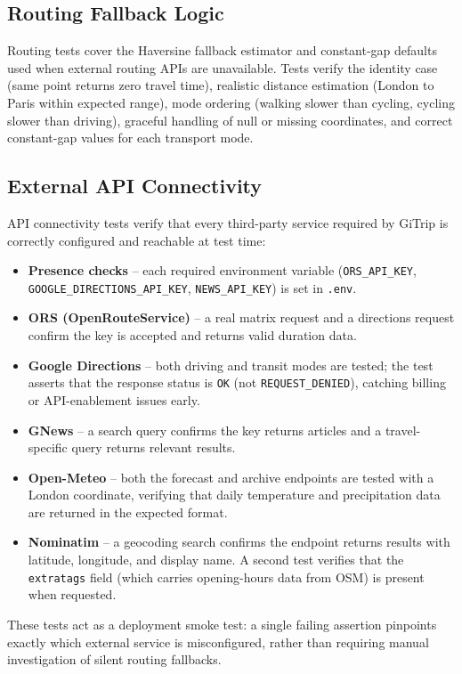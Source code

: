 \subsection{Routing Fallback Logic}
Routing tests cover the Haversine fallback estimator and constant-gap defaults used when external routing APIs are unavailable. Tests verify the identity case (same point returns zero travel time), realistic distance estimation (London to Paris within expected range), mode ordering (walking slower than cycling, cycling slower than driving), graceful handling of null or missing coordinates, and correct constant-gap values for each transport mode.

\subsection{External API Connectivity}
API connectivity tests verify that every third-party service required by GiTrip
is correctly configured and reachable at test time:
\begin{itemize}
  \item \textbf{Presence checks} -- each required environment variable
        (\texttt{ORS\_API\_KEY}, \texttt{GOOGLE\_DIRECTIONS\_API\_KEY},
        \texttt{NEWS\_API\_KEY}) is set in \texttt{.env}.
  \item \textbf{ORS (OpenRouteService)} -- a real matrix request and a
        directions request confirm the key is accepted and returns valid
        duration data.
  \item \textbf{Google Directions} -- both driving and transit modes are
        tested; the test asserts that the response status is \texttt{OK}
        (not \texttt{REQUEST\_DENIED}), catching billing or API-enablement
        issues early.
  \item \textbf{GNews} -- a search query confirms the key returns articles
        and a travel-specific query returns relevant results.
  \item \textbf{Open-Meteo} -- both the forecast and archive endpoints are
        tested with a London coordinate, verifying that daily temperature
        and precipitation data are returned in the expected format.
  \item \textbf{Nominatim} -- a geocoding search confirms the endpoint
        returns results with latitude, longitude, and display name. A
        second test verifies that the \texttt{extratags} field (which
        carries opening-hours data from OSM) is present when requested.
\end{itemize}
These tests act as a deployment smoke test: a single failing assertion
pinpoints exactly which external service is misconfigured, rather than
requiring manual investigation of silent routing fallbacks.

